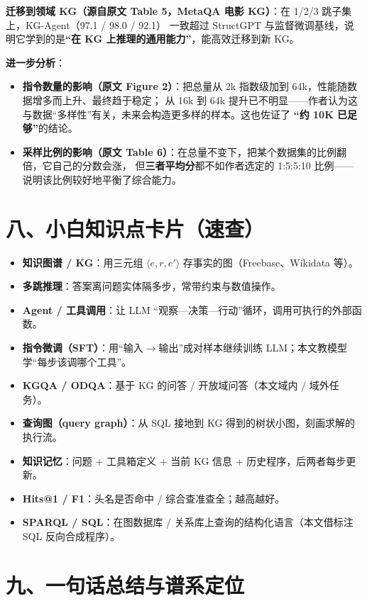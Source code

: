 \documentclass[11pt,UTF8,fontset=fandol]{ctexart}
\begin{document}
\textbf{迁移到领域 KG（源自原文 Table 5，MetaQA 电影 KG）}：在 1/2/3 跳子集上，KG-Agent（97.1 / 98.0 / 92.1）
一致超过 StructGPT 与监督微调基线，说明它学到的是\textbf{“在 KG 上推理的通用能力”}，能高效迁移到新 KG。

\textbf{进一步分析}：
\begin{itemize}[leftmargin=2em]
  \item \textbf{指令数量的影响（原文 Figure 2）}：把总量从 2k 指数级加到 64k，性能随数据增多而上升、最终趋于稳定；
        从 16k 到 64k 提升已不明显——作者认为这与数据“多样性”有关，未来会构造更多样的样本。这也佐证了
        \textbf{“约 10K 已足够”}的结论。
  \item \textbf{采样比例的影响（原文 Table 6）}：在总量不变下，把某个数据集的比例翻倍，它自己的分数会涨，
        但\textbf{三者平均分}都不如作者选定的 1:5:5:10 比例——说明该比例较好地平衡了综合能力。
\end{itemize}

\section{八、小白知识点卡片（速查）}
\begin{itemize}[leftmargin=2em]
  \item \textbf{知识图谱 / KG}：用三元组 $\langle e,r,e'\rangle$ 存事实的图（Freebase、Wikidata 等）。
  \item \textbf{多跳推理}：答案离问题实体隔多步，常带约束与数值操作。
  \item \textbf{Agent / 工具调用}：让 LLM “观察—决策—行动”循环，调用可执行的外部函数。
  \item \textbf{指令微调（SFT）}：用“输入$\to$输出”成对样本继续训练 LLM；本文教模型学“每步该调哪个工具”。
  \item \textbf{KGQA / ODQA}：基于 KG 的问答 / 开放域问答（本文域内 / 域外任务）。
  \item \textbf{查询图（query graph）}：从 SQL 接地到 KG 得到的树状小图，刻画求解的执行流。
  \item \textbf{知识记忆}：问题 + 工具箱定义 + 当前 KG 信息 + 历史程序，后两者每步更新。
  \item \textbf{Hits@1 / F1}：头名是否命中 / 综合查准查全；越高越好。
  \item \textbf{SPARQL / SQL}：在图数据库 / 关系库上查询的结构化语言（本文借标注 SQL 反向合成程序）。
\end{itemize}

\section{九、一句话总结与谱系定位}
\end{document}
